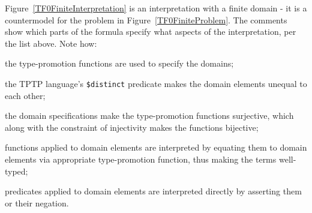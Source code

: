 \documentclass[letterpaper]{article}
\newcommand{\smalltt}[1]{\small \texttt{#1}}
\newenvironment{packed_itemize}{
\vspace*{-0.5em}
\begin{itemize}
\setlength{\partopsep}{0pt}
\setlength{\itemsep}{1pt}
\setlength{\parskip}{0pt}
\setlength{\parsep}{0pt}
}{\end{itemize}}
\begin{document}
Figure~\ref{TF0FiniteInterpretation} is an interpretation with a finite domain - it is a 
countermodel for the problem in Figure~\ref{TF0FiniteProblem}.
The comments show which parts of the formula specify what aspects of the interpretation, per
the list above.
Note how:
\begin{packed_itemize}
\item the type-promotion functions are used to specify the domains;
\item the TPTP language's \smalltt{\$distinct} predicate makes the domain elements unequal to
      each other;
\item the domain specifications make the type-promotion functions surjective, which along
      with the constraint of injectivity makes the functions bijective;
\item functions applied to domain elements are interpreted by equating them to domain elements
      via appropriate type-promotion function, thus making the terms well-typed;
\item predicates applied to domain elements are interpreted directly by asserting them or their
      negation.
\end{packed_itemize}
\end{document}
